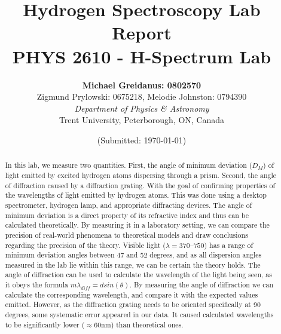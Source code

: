 \documentclass[letterpaper,11pt] {article}
\begin{document}

\title{\textbf{Hydrogen Spectroscopy Lab Report}\\\normalsize{PHYS 2610 - H-Spectrum Lab}}
\author{\textbf{Michael Greidanus: 0802570} \\
Zigmund Prylowski: 0675218, Melodie Johnston: 0794390
\\\emph{Department of Physics \& Astronomy}\\ Trent University, Peterborough, ON, Canada}
\date{(Submitted: \today)}
\maketitle

\begin{abstract}

In this lab, we measure two quantities. First, the angle of minimum deviation ($D_M$) of light emitted by excited hydrogen atoms dispersing through a prism.  Second, the angle of diffraction caused by a diffraction grating. With the goal of confirming properties of the wavelengths of light emitted by hydrogen atoms. This was done using a desktop spectrometer, hydrogen lamp, and appropriate diffracting devices. The angle of minimum deviation is a direct property of its refractive index and thus can be calculated theoretically. By measuring it in a laboratory setting, we can compare the precision of real-world phenomena to theoretical models and draw conclusions regarding the precision of the theory. Visible light ($\lambda = 370 – 750$) has a range of minimum deviation angles between 47\textdegree\text{} and 52\textdegree\text{} degrees, and as all dispersion angles measured in the lab lie within this range, we can be certain the theory holds. 
The angle of diffraction can be used to calculate the wavelength of the light being seen, as it obeys the formula $m\lambda_{diff} = d sin(\theta)$. By measuring the angle of diffraction we can calculate the corresponding wavelength, and compare it with the expected values emitted. However, as the diffraction grating needs to be oriented specifically at 90 degrees, some systematic error appeared in our data. It caused calculated wavelengths to be significantly lower ($\approx 60$nm) than theoretical ones. 

\end{abstract}

\renewcommand{\contentsname}{\textcolor{black}{Table of Contents}}
\tableofcontents %
\end{document}
